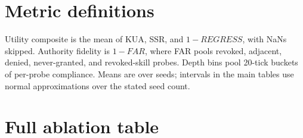 \documentclass[11pt]{article}
\begin{document}
\section{Metric definitions}
Utility composite is the mean of KUA, SSR, and $1-REGRESS$, with NaNs skipped. Authority fidelity is $1-FAR$, where FAR pools revoked, adjacent, denied, never-granted, and revoked-skill probes. Depth bins pool 20-tick buckets of per-probe compliance. Means are over seeds; intervals in the main tables use normal approximations over the stated seed count.

\clearpage

\section{Full ablation table}
\end{document}
